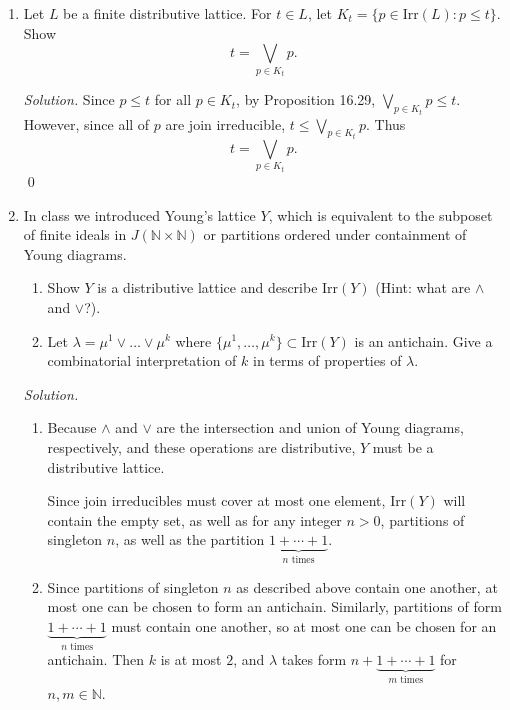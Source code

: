 \documentclass[11pt,letterpaper,dvipsnames]{article}
\newenvironment{solution}{\color{SeaGreen}\textit{Solution.}}{\color{black}}
\begin{document}
\begin{enumerate}
\begin{solution}
    $(\impliedby)$ Now assume that $\vee$ distributes over $\wedge$. We let $\tilde{L}$, the \textit{dual} of $L$, be the lattice where $p\leq_L{q} \iff q\leq_{\tilde{L}}{p}$. We see that $\tilde{L}$ is indeed a lattice, since $\vee_L=\wedge_{\tilde{L}}$ and $\wedge_L=\vee_{\tilde{L}}$. Using this duality, $(\impliedby)$ for $L$ is equivalent to $(\implies)$ for $\tilde{L}$, so we are done. \qed
\end{solution}

\item Let $L$ be a finite distributive lattice. 
For $t \in L$, let $K_t = \{p \in \mbox{Irr}(L): p \leq t\}$.
Show
\[
t = \bigvee_{p \in K_t} p.
\]

\begin{solution}
    Since $p\leq t$ for all $p\in K_t$, by Proposition 16.29, $\bigvee_{p \in K_t} p \leq t$. However, since all of $p$ are join irreducible, $t \leq \bigvee_{p \in K_t} p$. Thus
    \[
t = \bigvee_{p \in K_t} p.
\]
\qed
\end{solution}

\item 
In class we introduced Young's lattice $Y$, which is equivalent to the subposet of finite ideals in $J(\mathbb{N} \times \mathbb{N})$ or partitions ordered under containment of Young diagrams.
\begin{enumerate}
\item Show $Y$ is a distributive lattice and describe $\mbox{Irr}(Y)$ (Hint: what are $\wedge$ and $\vee$?).
\item Let $\lambda = \mu^1 \vee \dots \vee \mu^k$ where $\{\mu^1,\dots,\mu^k\} \subset \mbox{Irr}(Y)$ is an antichain.
Give a combinatorial interpretation of $k$ in terms of properties of $\lambda$.
\end{enumerate}

\begin{solution}
\begin{enumerate}
    \item Because $\wedge$ and $\vee$ are the intersection and union of Young diagrams, respectively, and these operations are distributive, $Y$ must be a distributive lattice.
    
    Since join irreducibles must cover at most one element, $\mbox{Irr}(Y)$ will contain the empty set, as well as for any integer $n>0$, partitions of singleton $n$, as well as the partition $\underbrace {1+\cdots +1} _{n{\text{ times}}}$.
    
    \item Since partitions of singleton $n$ as described above contain one another, at most one can be chosen to form an antichain. Similarly, partitions of form $\underbrace {1+\cdots +1} _{n{\text{ times}}}$ must contain one another, so at most one can be chosen for an antichain. Then $k$ is at most $2$, and $\lambda$ takes form $n+\underbrace {1+\cdots +1} _{m{\text{ times}}}$ for $n,m\in{\mathbb{N}}$.
\end{enumerate}
\end{solution}

\end{enumerate}
\end{document}
